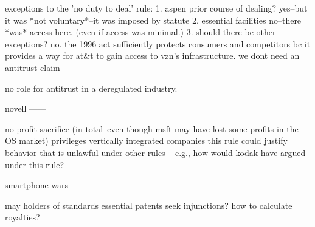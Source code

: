     exceptions to the 'no duty to deal' rule:
        1. aspen
            prior course of dealing? yes--but it was *not voluntary*--it was imposed by statute
        2. essential facilities
            no--there *was* access here. (even if access was minimal.)
        3. should there be other exceptions?
            no.
            the 1996 act sufficiently protects consumers and competitors bc it provides a way for at\&t to gain access to vzn's infrastructure. we dont need an antitrust claim

    no role for antitrust in a deregulated industry.

novell
------

no profit sacrifice (in total--even though msft may have lost some profits in the OS market)
    privileges vertically integrated companies
    this rule could justify behavior that is unlawful under other rules -- e.g., how would kodak have argued under this rule? 

smartphone wars
---------------

may holders of standards essential patents seek injunctions?
how to calculate royalties?

